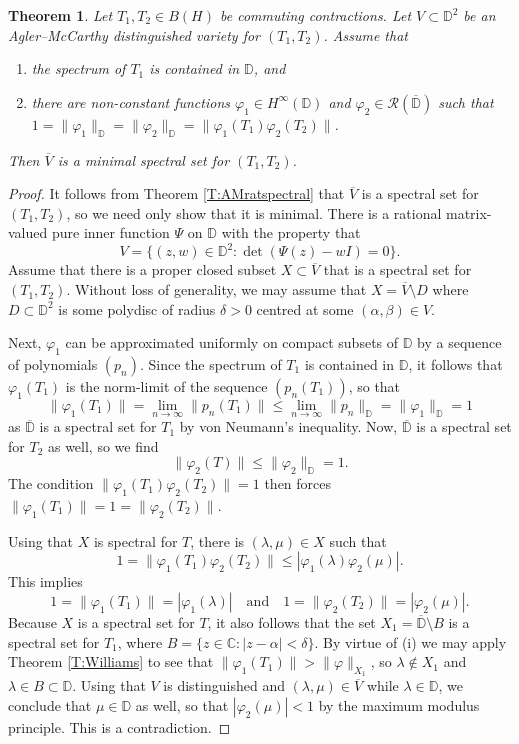 \documentclass[10pt]{amsart}
\newcommand{\bC}{{\mathbb{C}}}
\newcommand{\bD}{{\mathbb{D}}}
\newcommand{\R}{{\mathcal{R}}}
\renewcommand{\phi}{\varphi}
\newcommand{\ol}{\overline}
\newcommand{\qand}{\quad\text{and}\quad}
\newtheorem{theorem}[lemma]{Theorem}
\theoremstyle{definition}
\begin{document}
\begin{theorem}\label{T:min2var}
Let $T_1,T_2\in B(H)$ be commuting contractions. Let $V\subset \bD^2$ be an Agler--McCarthy distinguished variety for $(T_1,T_2)$. 
Assume that
\begin{enumerate}[{\rm (i)}]
\item the spectrum of $T_1$ is contained in $\bD$, and
\item there are non-constant functions $\phi_1\in H^\infty(\bD)$ and $\phi_2\in \R(\ol{\bD})$ such that $1=\|\phi_1\|_{\bD}=\|\phi_2\|_{\bD}=\|\phi_1(T_1)\phi_2(T_2)\|$.
\end{enumerate}
Then $\ol{V}$ is a minimal spectral set for $(T_1,T_2)$.
\end{theorem}
\begin{proof}
It follows from Theorem \ref{T:AMratspectral} that $\ol{V}$ is a spectral set for $(T_1,T_2)$, so we need only show that it is minimal. There is a  rational matrix-valued pure inner function $\Psi$ on $\bD$ with the property that
\[
V=\{(z,w)\in \bD^2:\det(\Psi(z)-wI)=0\}.
\]
Assume that there is a proper closed subset $X\subset \ol{V}$ that is  a spectral set for $(T_1,T_2)$. 
Without loss of generality, we may assume that $X=\ol{V}\setminus D$ where $D\subset \bD^2$ is some polydisc of radius $\delta>0$ centred at some $(\alpha,\beta)\in V$. 


Next, $\phi_1$ can be approximated uniformly on compact subsets of $\bD$ by a sequence of polynomials $(p_n)$. Since the spectrum of $T_1$ is contained in $\bD$, it follows that $\phi_1(T_1)$ is the norm-limit of the sequence $(p_n(T_1))$, so that
\[
\|\phi_1(T_1)\|=\lim_{n\to \infty} \|p_n(T_1)\|\leq \lim_{n\to \infty} \|p_n\|_{\bD}=\|\phi_1\|_{\bD}=1
\]
as $\ol{\bD}$ is a spectral set for $T_1$ by von Neumann's inequality. Now, $\ol{\bD}$ is a spectral set for $T_2$ as well, so we find
\[
\|\phi_2(T)\|\leq \|\phi_2\|_{\bD}=1.
\]
The condition $\|\phi_1(T_1)\phi_2(T_2)\|=1$ then forces $\|\phi_1(T_1)\|=1=\|\phi_2(T_2)\|$.

Using that $X$ is spectral for $T$, there is $(\lambda,\mu)\in X$ such that
\[
1=\|\phi_1(T_1)\phi_2(T_2)\|\leq |\phi_1(\lambda)\phi_2(\mu)|.
\]
This implies 
\[
1=\|\phi_1(T_1)\|=|\phi_1(\lambda)| \qand 1=\|\phi_2(T_2)\|=|\phi_2(\mu)|.
\]
Because $X$ is a spectral set for $T$, it also follows that the set $X_1=\ol{\bD}\setminus B$ is a spectral set for $T_1$, where $B=\{z\in \bC:|z-\alpha|<\delta\}$.  By virtue of (i) we may apply Theorem \ref{T:Williams}  to see that  $\|\phi_1(T_1)\|>\|\phi\|_{X_1}$, so $\lambda\notin X_1$ and $\lambda\in B\subset \bD$. Using that $V$ is distinguished and $(\lambda, \mu)\in \ol{V}$ while $\lambda\in \bD$, we conclude that $\mu\in \bD$ as well,  so that $|\phi_2(\mu)|<1$ by the maximum modulus principle. This is a contradiction.
\end{proof}
\end{document}

